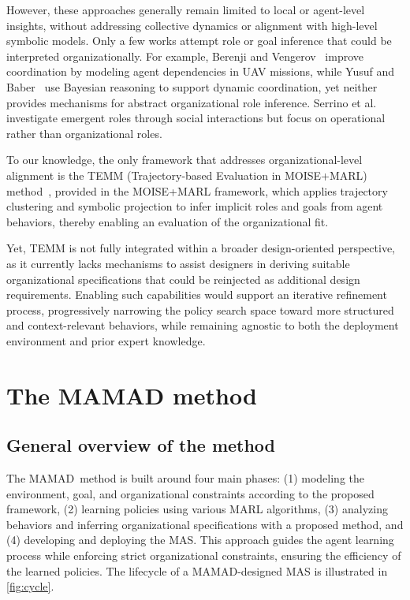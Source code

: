 \documentclass[pdflatex,sn-mathphys-num]{sn-jnl}%
\theoremstyle{thmstyleone}%
\theoremstyle{thmstyletwo}%
\theoremstyle{thmstylethree}%
\begin{document}
However, these approaches generally remain limited to local or agent-level insights, without addressing collective dynamics or alignment with high-level symbolic models. Only a few works attempt role or goal inference that could be interpreted organizationally. For example, Berenji and Vengerov~\cite{berenji2000learning} improve coordination by modeling agent dependencies in UAV missions, while Yusuf and Baber~\cite{yusuf2020inferential} use Bayesian reasoning to support dynamic coordination, yet neither provides mechanisms for abstract organizational role inference. Serrino et al.~\cite{serrino2019finding} investigate emergent roles through social interactions but focus on operational rather than organizational roles.

To our knowledge, the only framework that addresses organizational-level alignment is the TEMM (Trajectory-based Evaluation in MOISE+MARL) method~\cite{soule2025moisemarl}, provided in the MOISE+MARL framework, which applies trajectory clustering and symbolic projection to infer implicit roles and goals from agent behaviors, thereby enabling an evaluation of the organizational fit. 

Yet, TEMM is not fully integrated within a broader design-oriented perspective, as it currently lacks mechanisms to assist designers in deriving suitable organizational specifications that could be reinjected as additional design requirements. Enabling such capabilities would support an iterative refinement process, progressively narrowing the policy search space toward more structured and context-relevant behaviors, while remaining agnostic to both the deployment environment and prior expert knowledge.



\section{The MAMAD method}\label{sec:mamad}

\subsection{General overview of the method}

The MAMAD~\footnotemark[1] method is built around four main phases: (1) modeling the environment, goal, and organizational constraints according to the proposed framework, (2) learning policies using various MARL algorithms, (3) analyzing behaviors and inferring organizational specifications with a proposed method, and (4) developing and deploying the MAS. This approach guides the agent learning process while enforcing strict organizational constraints, ensuring the efficiency of the learned policies. The lifecycle of a MAMAD-designed MAS is illustrated in \autoref{fig:cycle}.
\end{document}
